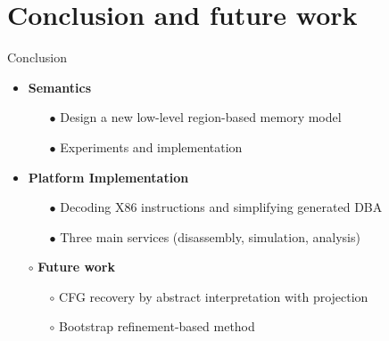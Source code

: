 \section{Conclusion and future work}

\begin{frame}{Conclusion}
      \begin{itemize}
      \item \textbf{Semantics}
      \begin{itemize}
      \item[$\bullet$] Design a new low-level region-based memory model
      \item[$\bullet$] Experiments and implementation
      \end{itemize}
      \bigskip
      \item \textbf{Platform Implementation}
      \begin{itemize}
      \item[$\bullet$] Decoding X86 instructions and simplifying generated DBA
      \item[$\bullet$] Three main services (disassembly, simulation, analysis)
      \end{itemize}
      \bigskip
      \item[$\circ$] \textbf {Future work}
      \begin{itemize}
      \item[$\circ$] CFG recovery by abstract interpretation with projection
      \item[$\circ$] Bootstrap refinement-based method~
      \end{itemize}
      \end{itemize}
\end{frame}


